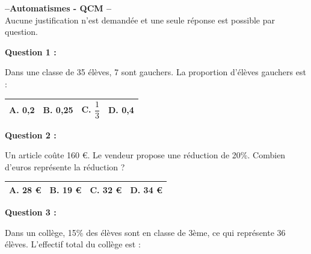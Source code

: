 \documentclass[12pt,a4paper]{article}
\begin{document}
\begin{center}
    \Large \textbf{--Automatismes - QCM --} \\[5pt]
    \normalsize Aucune justification n’est demandée et une seule réponse est possible par question.
\end{center}

\vspace{0.7cm}

\textbf{Question 1 :}
\vspace{5pt}

Dans une classe de 35 élèves, 7 sont gauchers. La proportion d’élèves gauchers est :
\vspace{0.3cm}

\renewcommand{\arraystretch}{3}
\begin{tabular}{|m{3.4cm}|m{3.4cm}|m{3.4cm}|m{3.4cm}|}
\hline
\centering \vspace{-0.3cm} \textbf{A.} 0,2 & 
\centering \vspace{-0.3cm} \textbf{B.} 0,25 & 
\centering \vspace{-0.3cm} \textbf{C.} $\dfrac{1}{3}$ & 
\centering \vspace{-0.3cm} \textbf{D.} 0,4 \tabularnewline
\hline
\end{tabular}

\vspace{0.7cm}

\textbf{Question 2 :}
\vspace{5pt}

Un article coûte 160 €. Le vendeur propose une réduction de 20\%. Combien d'euros représente la réduction ?
\vspace{0.3cm}

\renewcommand{\arraystretch}{3}
\begin{tabular}{|m{3.4cm}|m{3.4cm}|m{3.4cm}|m{3.4cm}|}
\hline
\centering \vspace{-0.3cm} \textbf{A.} 28 € & 
\centering \vspace{-0.3cm} \textbf{B.} 19 € & 
\centering \vspace{-0.3cm} \textbf{C.} 32 € & 
\centering \vspace{-0.3cm} \textbf{D.} 34 € \tabularnewline
\hline
\end{tabular}

\vspace{0.7cm}

\textbf{Question 3 :}
\vspace{5pt}

Dans un collège, 15\% des élèves sont en classe de 3ème, ce qui représente 36 élèves. L’effectif total du collège est :
\vspace{0.3cm}
\end{document}

